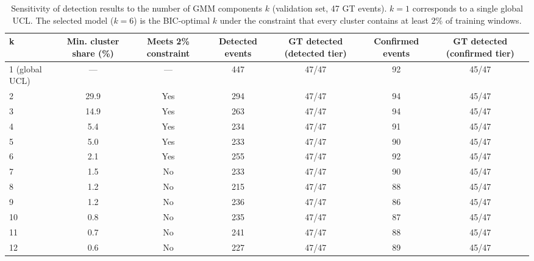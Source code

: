 \begin{table}
\caption{Sensitivity of detection results to the number of GMM components $k$ (validation set, 47 GT events). $k=1$ corresponds to a single global UCL. The selected model ($k=6$) is the BIC-optimal $k$ under the constraint that every cluster contains at least 2\% of training windows.}
\label{tab:k_sensitivity}
\begin{tabular}{lcccccc}
\toprule
k & Min. cluster share (\%) & Meets 2\% constraint & Detected events & GT detected (detected tier) & Confirmed events & GT detected (confirmed tier) \\
\midrule
1 (global UCL) & — & — & 447 & 47/47 & 92 & 45/47 \\
2 & 29.9 & Yes & 294 & 47/47 & 94 & 45/47 \\
3 & 14.9 & Yes & 263 & 47/47 & 94 & 45/47 \\
4 & 5.4 & Yes & 234 & 47/47 & 91 & 45/47 \\
5 & 5.0 & Yes & 233 & 47/47 & 90 & 45/47 \\
6 & 2.1 & Yes & 255 & 47/47 & 92 & 45/47 \\
7 & 1.5 & No & 233 & 47/47 & 90 & 45/47 \\
8 & 1.2 & No & 215 & 47/47 & 88 & 45/47 \\
9 & 1.2 & No & 236 & 47/47 & 86 & 45/47 \\
10 & 0.8 & No & 235 & 47/47 & 87 & 45/47 \\
11 & 0.7 & No & 241 & 47/47 & 88 & 45/47 \\
12 & 0.6 & No & 227 & 47/47 & 89 & 45/47 \\
\bottomrule
\end{tabular}
\end{table}

